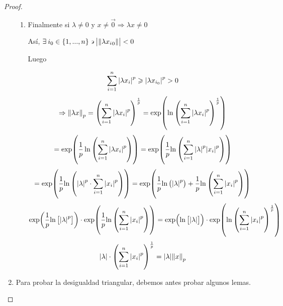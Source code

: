 \begin{proof}
\begin{enumerate}[label=(\subscript{D}{{\arabic*}})]
\begin{enumerate}
        \item Finalmente si $\lambda \neq 0 $ y $ x \neq \vec{0} \Rightarrow \lambda x \neq 0$

        Así, $\exists \: i_0 \in \{ 1,...,n \} \backepsilon \abs{\norm{ \lambda {{x}_{i}}_{0}}} < 0$

        Luego 

         \begin{equation*}
            \sum_{i=1}^{n} {\abs{\lambda {x}_{i}}}^{p} \geqslant {\abs{\lambda x_{i_0}}}^{p} > 0
        \end{equation*}
        \begin{equation*}
            \Rightarrow  {\norm{\lambda x}}_{p} = {\left( \sum_{i=1}^{n} {\abs{\lambda {x}_{i}}}^{p}\right)}^{\frac{1}{p}} = \exp ({\ln {\left( \sum\limits_{i=1}^{n} {\abs{\lambda {x}_{i}}}^{p}\right)}^{\frac{1}{p}}})
        \end{equation*}
        \begin{equation*}
            = \exp({ {\frac{1}{p}} \ln  {\left( \sum\limits_{i=1}^{n} {\abs{\lambda {x}_{i}}}^{p}\right)}}) = \exp( {\frac{1}{p}} {\ln {\left( \sum\limits_{i=1}^{n} {\abs{\lambda}}^{p} {\abs{{x}_{i}}}^{p} \right)}})
        \end{equation*}
        \begin{equation*}
            = \exp( {\frac{1}{p}} {\ln {\left( {\abs{\lambda}}^{p} \cdot \sum\limits_{i=1}^{n}  {\abs{{x}_{i}}}^{p} \right)}}) = \exp( {\frac{1}{p}} {\ln {\left( {\abs{\lambda}}^{p} \right)}} + {\frac{1}{p}} {\ln {\left( \sum\limits_{i=1}^{n}  {\abs{{x}_{i}}}^{p} \right)}})
        \end{equation*}
        \begin{equation*}
            \exp( {\frac{1}{p}} {\ln {\left[ {\abs{\lambda}}^{p} \right]}}) \cdot \exp( {\frac{1}{p}} {\ln {\left( \sum\limits_{i=1}^{n}  {\abs{{x}_{i}}}^{p} \right)}}) = \exp({\ln {\left[ \abs{\lambda} \right]}}) \cdot \exp( \ln {\left( \sum_{i=1}^{n} {\abs{{x}_{i}}}^{p}\right)}^{\frac{1}{p}} )
        \end{equation*}
        \begin{equation*}
            \abs{\lambda} \cdot {\left( \sum_{i=1}^{n} {\abs{{x}_{i}}}^{p}\right)}^{\frac{1}{p}} = \abs{\lambda} {\norm{x}}_{p}
        \end{equation*}
    \end{enumerate}
    \item Para probar la desigualdad triangular, debemos antes probar algunos lemas.
    \end{enumerate}
\end{proof}

